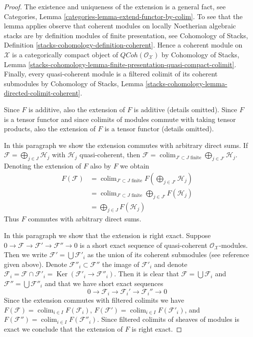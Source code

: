 \documentclass{stacks-project}
\theoremstyle{plain}
\theoremstyle{definition}
\theoremstyle{remark}
\numberwithin{equation}{subsection}
\def\colim{\mathop{\mathrm{colim}}\nolimits}
\def\QCoh{\mathit{QCoh}}
\def\Ker{\mathop{\mathrm{Ker}}}
\begin{document}
\begin{proof}
The existence and uniqueness of the extension is a general fact, see
Categories, Lemma \ref{categories-lemma-extend-functor-by-colim}.
To see that the lemma applies observe that coherent modules on
locally Noetherian algebraic stacks are by definition modules
of finite presentation, see
Cohomology of Stacks, Definition \ref{stacks-cohomology-definition-coherent}.
Hence a coherent module on $\mathcal{X}$ is a
categorically compact object of $\QCoh(\mathcal{O}_\mathcal{X})$ by
Cohomology of Stacks, Lemma
\ref{stacks-cohomology-lemma-finite-presentation-quasi-compact-colimit}.
Finally, every quasi-coherent module is a filtered colimit of
its coherent submodules by Cohomology of Stacks, Lemma
\ref{stacks-cohomology-lemma-directed-colimit-coherent}.

\medskip\noindent
Since $F$ is additive, also the extension of $F$ is additive (details omitted).
Since $F$ is a tensor functor and since colimits of modules
commute with taking tensor products, also the extension of $F$
is a tensor functor (details omitted).

\medskip\noindent
In this paragraph we show the extension commutes with arbitrary
direct sums. If $\mathcal{F} = \bigoplus_{j \in J} \mathcal{H}_j$
with $\mathcal{H}_j$ quasi-coherent, then
$\mathcal{F} = \colim_{J' \subset J\text{ finite}}
\bigoplus_{j \in J'} \mathcal{H}_j$.
Denoting the extension of $F$ also by $F$ we obtain
\begin{align*}
F(\mathcal{F})
& =
\colim_{J' \subset J\text{ finite}}
F(\bigoplus\nolimits_{j \in J'} \mathcal{H}_j) \\
& =
\colim_{J' \subset J\text{ finite}}
\bigoplus\nolimits_{j \in J'} F(\mathcal{H}_j) \\
& =
\bigoplus\nolimits_{j \in J} F(\mathcal{H}_j)
\end{align*}
Thus $F$ commutes with arbitrary direct sums.

\medskip\noindent
In this paragraph we show that the extension is right exact.
Suppose $0 \to \mathcal{F} \to \mathcal{F}' \to \mathcal{F}'' \to 0$
is a short exact sequence of quasi-coherent $\mathcal{O}_\mathcal{X}$-modules.
Then we write $\mathcal{F}' = \bigcup \mathcal{F}'_i$ as the
union of its coherent submodules (see reference given above).
Denote $\mathcal{F}''_i \subset \mathcal{F}''$ the image of $\mathcal{F}'_i$
and denote $\mathcal{F}_i = \mathcal{F} \cap \mathcal{F}'_i =
\Ker(\mathcal{F}'_i \to \mathcal{F}''_i)$. Then it is clear that
$\mathcal{F} = \bigcup \mathcal{F}_i$ and
$\mathcal{F}'' = \bigcup \mathcal{F}''_i$
and that we have short exact sequences
$$
0 \to \mathcal{F}_i \to \mathcal{F}_i' \to \mathcal{F}_i'' \to 0
$$
Since the extension commutes with filtered colimits we have
$F(\mathcal{F}) = \colim_{i \in I} F(\mathcal{F}_i)$,
$F(\mathcal{F}') = \colim_{i \in I} F(\mathcal{F}'_i)$, and
$F(\mathcal{F}'') = \colim_{i \in I} F(\mathcal{F}''_i)$.
Since filtered colimits of sheaves of modules is exact we
conclude that the extension of $F$ is right exact.


\end{proof}
\end{document}
